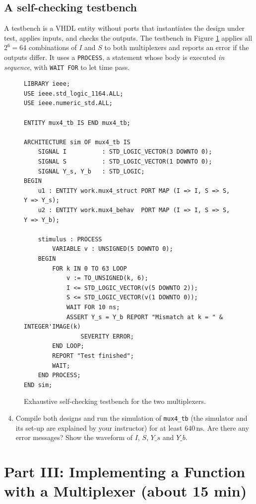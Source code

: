 \documentclass{article}
\begin{document}
\subsection*{A self-checking testbench}
A testbench is a VHDL entity without ports that instantiates the design under test, applies inputs, and checks the outputs. The testbench in Figure \ref{fig:tb} applies all $2^6 = 64$ combinations of $I$ and $S$ to both multiplexers and reports an error if the outputs differ. It uses a \texttt{PROCESS}, a statement whose body is executed \emph{in sequence}, with \texttt{WAIT FOR} to let time pass.

\begin{figure}[H]
    \centering
    \begin{verbatim}
LIBRARY ieee;
USE ieee.std_logic_1164.ALL;
USE ieee.numeric_std.ALL;

ENTITY mux4_tb IS END mux4_tb;

ARCHITECTURE sim OF mux4_tb IS
    SIGNAL I          : STD_LOGIC_VECTOR(3 DOWNTO 0);
    SIGNAL S          : STD_LOGIC_VECTOR(1 DOWNTO 0);
    SIGNAL Y_s, Y_b   : STD_LOGIC;
BEGIN
    u1 : ENTITY work.mux4_struct PORT MAP (I => I, S => S, Y => Y_s);
    u2 : ENTITY work.mux4_behav  PORT MAP (I => I, S => S, Y => Y_b);

    stimulus : PROCESS
        VARIABLE v : UNSIGNED(5 DOWNTO 0);
    BEGIN
        FOR k IN 0 TO 63 LOOP
            v := TO_UNSIGNED(k, 6);
            I <= STD_LOGIC_VECTOR(v(5 DOWNTO 2));
            S <= STD_LOGIC_VECTOR(v(1 DOWNTO 0));
            WAIT FOR 10 ns;
            ASSERT Y_s = Y_b REPORT "Mismatch at k = " & INTEGER'IMAGE(k)
                SEVERITY ERROR;
        END LOOP;
        REPORT "Test finished";
        WAIT;
    END PROCESS;
END sim;
    \end{verbatim}
    \caption{Exhaustive self-checking testbench for the two multiplexers.}
    \label{fig:tb}
\end{figure}

\begin{enumerate}
    \setcounter{enumi}{3}
    \item Compile both designs and run the simulation of \texttt{mux4\_tb} (the simulator and its set-up are explained by your instructor) for at least $640\,\mathrm{ns}$. Are there any error messages? Show the waveform of $I$, $S$, $Y\_s$ and $Y\_b$.
\end{enumerate}

\section*{Part III: Implementing a Function with a Multiplexer (about 15 min)}
\end{document}
